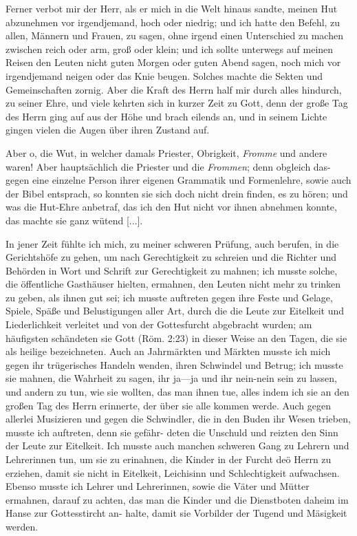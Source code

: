 Ferner verbot mir der Herr, als er mich in die Welt hinaus
sandte, meinen Hut abzunehmen 
vor irgendjemand, hoch oder
niedrig; und ich hatte den Befehl, zu allen, Männern und Frauen,
 zu sagen, ohne irgend einen Unterschied zu machen zwischen
reich oder arm, groß oder klein; und ich sollte unterwegs auf
meinen Reisen den Leuten nicht guten Morgen oder guten Abend
sagen, noch mich vor 
irgendjemand neigen oder das Knie beugen.
Solches machte die Sekten und Gemeinschaften 
zornig. Aber die
Kraft des Herrn  half mir durch alles hindurch, zu seiner Ehre,
und viele kehrten sich in kurzer Zeit zu Gott, denn der große
Tag des Herrn ging auf aus der Höhe und brach eilends an,
und in seinem Lichte gingen vielen die Augen über ihren 
Zustand auf.

Aber o, die Wut, in welcher damals Priester, Obrigkeit,
\textit{Fromme} und andere waren! Aber hauptsächlich die Priester
und die \textit{Frommen}; denn obgleich das-  gegen eine 
einzelne Person ihrer eigenen Grammatik und Formenlehre, sowie
auch der Bibel entsprach, so konnten sie sich doch nicht drein
finden, es zu hören; und was die Hut-Ehre anbetraf, das ich
den Hut nicht vor ihnen abnehmen konnte, das machte sie ganz
wütend [...].

In jener Zeit fühlte ich mich, zu meiner schweren Prüfung,
auch berufen, in die Gerichtshöfe zu gehen, um nach Gerechtigkeit
zu schreien und die Richter und Behörden in Wort und 
Schrift
zur Gerechtigkeit zu mahnen; ich musste solche, die öffentliche 
Gasthäuser hielten, ermahnen, den Leuten nicht mehr zu trinken 
zu
geben, als ihnen gut sei; ich musste auftreten gegen ihre Feste
und Gelage, Spiele, Späße und Belustigungen aller 
Art, durch
die die Leute zur Eitelkeit und Liederlichkeit verleitet und von
der Gottesfurcht abgebracht wurden; am häufigsten schändeten
sie Gott (Röm. 2:23) in dieser 
Weise an den Tagen, die sie als
heilige bezeichneten. Auch an Jahrmärkten 
und Märkten musste
ich mich gegen ihr trügerisches Handeln wenden, ihren Schwindel
und Betrug; ich musste sie mahnen, die Wahrheit 
zu sagen, ihr
ja—ja und ihr nein-nein sein zu lassen, und andern zu tun, wie
sie wollten, das man ihnen tue, alles indem ich sie an den großen
Tag des Herrn  erinnerte, der über sie alle kommen werde. Auch
gegen allerlei Musizieren und gegen die Schwindler, die in den
Buden ihr Wesen trieben, musste ich auftreten, denn sie gefähr-
deten die Unschuld und reizten den Sinn der Leute zur Eitelkeit.
Ich musste auch manchen schweren Gang zu Lehrern und Lehrerinnen
tun, um sie zu erinahnen, die Kinder in der Furcht deö Herrn zu
erziehen, damit sie nicht in Eitelkeit, Leichisinn und Schlechtigkeit
aufwachsen. Ebenso musste ich Lehrer und Lehrerinnen, sowie die
Väter und Mütter ermahnen, darauf zu achten, das man die
Kinder und die Dienstboten daheim im Hanse zur Gottesstircht an-
halte, damit sie Vorbilder der Tugend und Mäsigkeit werden.

